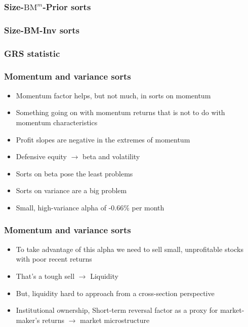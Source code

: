 \documentclass{beamer}
\begin{document}
\begin{frame}
\frametitle{Size-$\text{BM}^m$-Prior sorts}
\begin{center}
\resizebox*{!}{\dimexpr\textheight-1.3cm\relax}{
    
    }
\end{center}
\end{frame}

\begin{frame}
\frametitle{Size-BM-Inv sorts}
\begin{center}
\resizebox*{!}{\dimexpr\textheight-1.3cm\relax}{
    
    }
\end{center}
\end{frame}

\begin{frame}
\frametitle{GRS statistic}
\begin{center}
\resizebox*{!}{\dimexpr\textheight-1.3cm\relax}{
    
    }
\end{center}
\end{frame}

\begin{frame}
\frametitle{Momentum and variance sorts}
\begin{itemize}
    \item Momentum factor helps, but not much, in sorts on momentum
    \item Something going on with momentum returns that is not to do with
    momentum characteristics
    \item Profit slopes are negative in the extremes of momentum
    \item Defensive equity $\rightarrow$ beta and volatility
    \item Sorts on beta pose the least problems
    \item Sorts on variance are a big problem
    \item Small, high-variance alpha of -0.66\% per month
\end{itemize}
\end{frame}

\begin{frame}
\frametitle{Momentum and variance sorts}
\begin{itemize}
    \item To take advantage of this alpha we need to sell small,
    unprofitable stocks with poor recent returns
    \item That's a tough sell $\rightarrow$ Liquidity
    \item But, liquidity hard to approach from a cross-section perspective
    \item Institutional ownership, Short-term reversal factor as a proxy
    for market-maker's returns $\rightarrow$ market microstructure
\end{itemize}
\end{frame}
\end{document}
